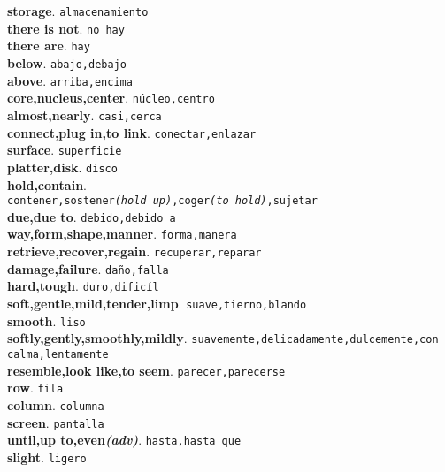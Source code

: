 \documentclass[twocolumn]{article}
\begin{document}
	\textsf{\textbf{storage}}. \texttt{almacenamiento}\\
	\textsf{\textbf{there is not}}. \texttt{no hay}\\
	\textsf{\textbf{there are}}. \texttt{hay}\\
	\textsf{\textbf{below}}. \texttt{abajo,debajo}\\
	\textsf{\textbf{above}}. \texttt{arriba,encima}\\
	\textsf{\textbf{core,nucleus,center}}. \texttt{n\'ucleo,centro}\\
	\textsf{\textbf{almost,nearly}}. \texttt{casi,cerca}\\
	\textsf{\textbf{connect,plug in,to link}}. \texttt{conectar,enlazar}\\
	\textsf{\textbf{surface}}. \texttt{superficie}\\
	\textsf{\textbf{platter,disk}}. \texttt{disco}\\
	\textsf{\textbf{hold,contain}}.\\\texttt{contener,sostener{\scriptsize \textsl{(hold up)}},coger{\scriptsize \textsl{(to hold)}},sujetar}\\
	\textsf{\textbf{due,due to}}. \texttt{debido,debido a}\\
	\textsf{\textbf{way,form,shape,manner}}. \texttt{forma,manera}\\
	\textsf{\textbf{retrieve,recover,regain}}. \texttt{recuperar,reparar}\\
	\textsf{\textbf{damage,failure}}. \texttt{da\~no,falla}\\
	\textsf{\textbf{hard,tough}}. \texttt{duro,dific\'il}\\
	\textsf{\textbf{soft,gentle,mild,tender,limp}}. \texttt{suave,tierno,blando}\\
	\textsf{\textbf{smooth}}. \texttt{liso}\\
	\textsf{\textbf{softly,gently,smoothly,mildly}}. \texttt{suavemente,delicadamente,dulcemente,con calma,lentamente}\\
	\textsf{\textbf{resemble,look like,to seem}}. \texttt{parecer,parecerse}\\
	\textsf{\textbf{row}}. \texttt{fila}\\
	\textsf{\textbf{column}}. \texttt{columna}\\
	\textsf{\textbf{screen}}. \texttt{pantalla}\\
	\textsf{\textbf{until,up to,even{\scriptsize \textsl{(adv)}}}}. \texttt{hasta,hasta que}\\
	\textsf{\textbf{slight}}. \texttt{ligero}\\
\end{document}
